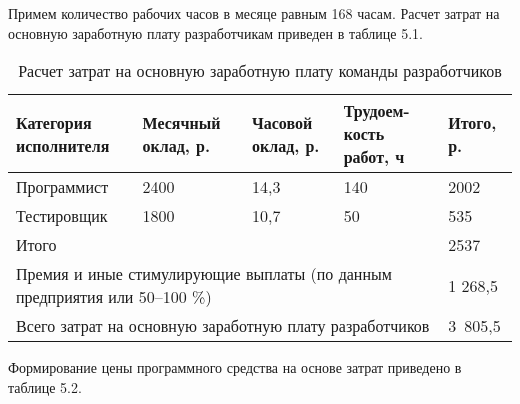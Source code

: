 Примем количество рабочих часов в месяце равным 168 часам. Расчет затрат на основную заработную плату разработчикам приведен в таблице 5.1. 





\begin{table}[H]
	\caption{Расчет затрат на основную заработную плату команды разработчиков}
	\centering 
	\begin{tabular}{|p{2.9cm}|p{3cm}|p{3cm}|p{2.5cm}|p{2.8cm}|}
	\hline 
	Категория исполнителя & Месячный оклад, р. & Часовой оклад, р. & Трудоем-кость работ, ч & Итого, р. \\ 
	\hline  
	Программист
	 & 2400
     & 14,3
     & 140 
     & 2002   \\
	\hline  
	Тестировщик & 1800  & 10,7  & 50  & 535  \\ 
	\hline   
	\multicolumn{4}{|p{11.4cm}|}{Итого} & 2537 \\ 
	\hline   
	\multicolumn{4}{|p{11.4cm}|}{Премия и иные стимулирующие выплаты (по данным предприятия или 50–100 \%)} & 1 268,5 \\ 
	\hline  
	\multicolumn{4}{|p{11.4cm}|}{Всего затрат на основную заработную плату разработчиков} & 3 805,5 \\ 

	\hline 
	
	\end{tabular}
	
\end{table}

Формирование цены программного средства на основе затрат приведено в таблице 5.2. 

